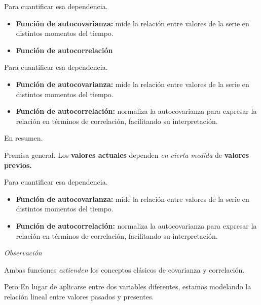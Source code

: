 \documentclass[11pt]{beamer}
\begin{document}
\begin{frame}{Para cuantificar esa dependencia.}
\begin{block}{}
	\begin{itemize}
		\item \textbf{Función de autocovarianza:} mide la relación entre valores de la serie en distintos momentos del tiempo.
		\item \textbf{Función de autocorrelación} 
	\end{itemize}
\end{block}
\end{frame}

\begin{frame}{Para cuantificar esa dependencia.}
\begin{block}{}
	\begin{itemize}
		\item \textbf{Función de autocovarianza:} mide la relación entre valores de la serie en distintos momentos del tiempo.
		\item \textbf{Función de autocorrelación:} normaliza la autocovarianza para expresar la relación en términos de correlación, facilitando su interpretación.  
	\end{itemize}
\end{block}
\end{frame}

\begin{frame}{En resumen.}
\begin{block}{Premisa general.}
	Los \textbf{valores actuales} dependen \textit{en cierta medida} de \textbf{valores previos.}
\end{block}
\begin{block}{Para cuantificar esa dependencia.}
	\begin{itemize}
		\item \textbf{Función de autocovarianza:} mide la relación entre valores de la serie en distintos momentos del tiempo.
		\item \textbf{Función de autocorrelación:} normaliza la autocovarianza para expresar la relación en términos de correlación, facilitando su interpretación.  
	\end{itemize}
\end{block}
\end{frame}

\begin{frame}{\textit{Observación}}
\begin{block}{}
	Ambas funciones \textit{extienden} los conceptos clásicos de covarianza y correlación.
\end{block}

\begin{block}{Pero}
	En lugar de aplicarse entre dos variables diferentes, estamos modelando la relación lineal entre valores pasados y presentes.
\end{block}
\end{frame}
\end{document}
